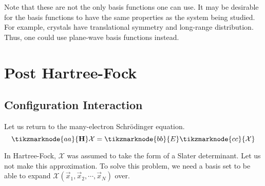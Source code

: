 \documentclass[12pt,a4paper,titlepage]{article}
\newcommand{\Chi}{\mathcal{X}} %
\begin{document}
Note that these are not the only basis functions one can use. It may be desirable for the basis functions to have the same properties as the system being studied. For example, crystals have translational symmetry and long-range distribution. Thus, one could use plane-wave basis functions instead.

\newpage
\section{Post Hartree-Fock}
\subsection{Configuration Interaction}
Let us return to the many-electron Schr\"{o}dinger equation.
\begin{equation}
\tikzmarknode{aa}{\vb{H}}\Chi=\tikzmarknode{bb}{E}\tikzmarknode{cc}{\Chi}
\end{equation}

In Hartree-Fock, $\Chi$ was assumed to take the form of a Slater determinant. Let us not make this approximation. To solve this problem, we need a basis set to be able to expand $\Chi(\vec{x}_{1},\vec{x}_{2},\cdots,\vec{x}_{N})$ over.\\
\end{document}
